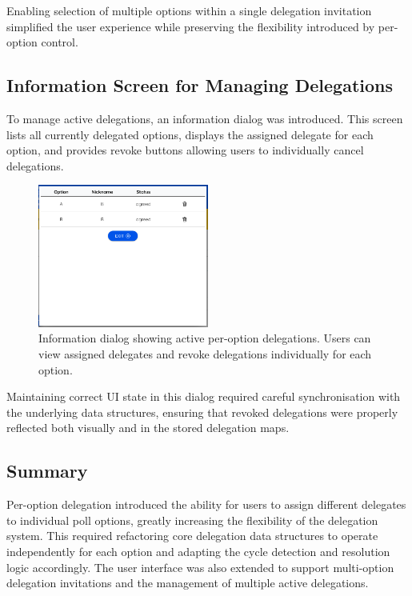 Enabling selection of multiple options within a single delegation invitation simplified the user experience while preserving the flexibility introduced by per-option control.

\subsection{Information Screen for Managing Delegations}

To manage active delegations, an information dialog was introduced. This screen lists all currently delegated options, displays the assigned delegate for each option, and provides revoke buttons allowing users to individually cancel delegations.


\begin{figure}[H]
  \centering
  \includegraphics[width=0.5\textwidth]{../common/peroption/info.png}
  \caption{Information dialog showing active per-option delegations. Users can view assigned delegates and revoke delegations individually for each option.}
  \label{fig:per-option-delegation-management}
\end{figure}

Maintaining correct UI state in this dialog required careful synchronisation with the underlying data structures, ensuring that revoked delegations were properly reflected both visually and in the stored delegation maps.

\subsection{Summary}

Per-option delegation introduced the ability for users to assign different delegates to individual poll options, greatly increasing the flexibility of the delegation system. This required refactoring core delegation data structures to operate independently for each option and adapting the cycle detection and resolution logic accordingly. The user interface was also extended to support multi-option delegation invitations and the management of multiple active delegations.

